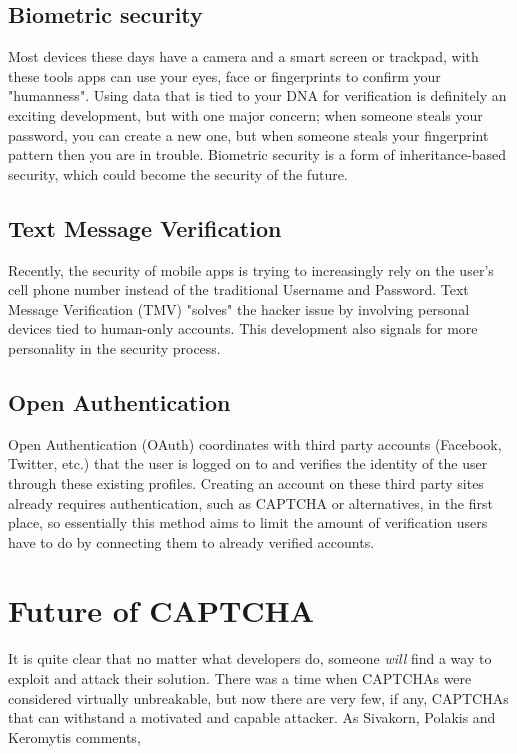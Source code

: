 \documentclass[a4paper]{IEEEtran}
\begin{document}
\subsection{Biometric security}
Most devices these days have a camera and a smart screen or trackpad, with these tools apps can use your eyes, face or fingerprints to confirm your "humanness". Using data that is tied to your DNA for verification is definitely an exciting development, but with one major concern; when someone steals your password, you can create a new one, but when someone steals your fingerprint pattern then you are in trouble. Biometric security is a form of inheritance-based security, which could become the security of the future.  

\subsection{Text Message Verification}
Recently, the security of mobile apps is trying to increasingly rely on the user's cell phone number instead of the traditional Username and Password. Text Message Verification (TMV) "solves" the hacker issue by involving personal devices tied to human-only accounts. This development also signals for more personality in the security process.

\subsection{Open Authentication}
Open Authentication (OAuth) coordinates with third party accounts (Facebook, Twitter, etc.) that the user is logged on to and verifies the identity of the user through these existing profiles. Creating an account on these third party sites already requires authentication, such as CAPTCHA or alternatives, in the first place, so essentially this method aims to limit the amount of verification users have to do by connecting them to already verified accounts.

\section{Future of CAPTCHA}
It is quite clear that no matter what developers do, someone \textit{will} find a way to exploit and attack their solution. There was a time when CAPTCHAs were considered virtually unbreakable, but now there are very few, if any, CAPTCHAs that can withstand a motivated and capable attacker. As Sivakorn, Polakis and Keromytis comments\cite{quote},
\end{document}
